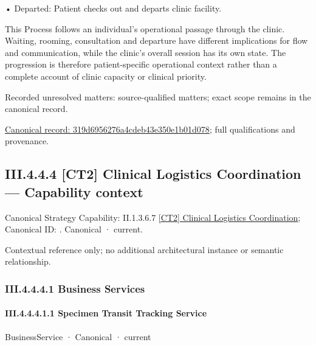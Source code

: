 •
Departed: Patient checks out and departs clinic facility.



This Process follows an individual's operational passage through the clinic. Waiting, rooming, consultation and departure have different implications for flow and communication, while the clinic's overall session has its own state. The progression is therefore patient-specific operational context rather than a complete account of clinic capacity or clinical priority.


{\small Recorded unresolved matters: source-qualified matters; exact scope remains in the canonical record.}\par
{\footnotesize \href{../../../../../../../continuum/business/business-process/319d6956276a4cdeb43e350e1b01d078.md}{Canonical record: 319d6956276a4cdeb43e350e1b01d078}; full qualifications and provenance.}\par
\subsection*{III.4.4.4 [CT2] Clinical Logistics Coordination — Capability context}
\label{navigation:III.4.4.4}

{\small Canonical Strategy Capability: II.1.3.6.7 \hyperref[element:0c27be11b4a44cb19e992309b8146a17]{[CT2] Clinical Logistics Coordination}; Canonical ID: \texttt{}. Canonical · current.}\par
Contextual reference only; no additional architectural instance or semantic relationship.\par
\subsubsection*{III.4.4.4.1 Business Services}
\label{navigation:III.4.4.4.1}

\paragraph*{III.4.4.4.1.1 Specimen Transit Tracking Service}
\label{navigation:III.4.4.4.1.1}

\label{element:100e740770bc4ab28cfe3c9af4b541cd}
{\small BusinessService · Canonical · current}\par

